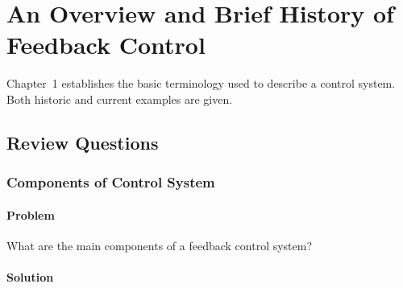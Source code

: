 
\chapter{An Overview and Brief History of Feedback Control}

Chapter~1 establishes the basic terminology used to describe a control system.
Both historic and current examples are given.

\section{Review Questions}

\subsection{Components of Control System}

\subsubsection{Problem}

What are the main components of a feedback control system?

\subsubsection{Solution}

